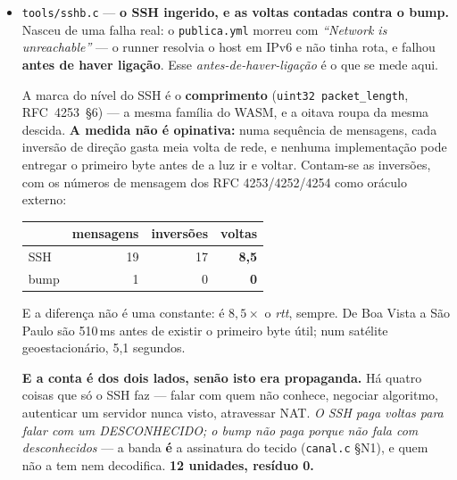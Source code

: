 \documentclass[11pt]{article}
\newcommand{\code}[1]{\texttt{\small #1}}
\theoremstyle{plain}
\theoremstyle{remark}
\begin{document}
\begin{itemize}
\textbf{E a ISA não precisou de crescer.} A do broca-so faz \code{LOAD} como
$B\leftarrow A;\ A\leftarrow \text{mem}[s]$ --- deslocar $A$ para $B$ e pôr o novo em $A$
\textbf{é literalmente um \emph{push} numa pilha de dois}. Simulando a pilha sobre os onze pares da
tradução, ela \textbf{nunca precisa de mais de dois}: os seis binários do wasm caem todos na ULA
sobre $(A,B)$, e o terceiro registador $R$ é onde o \code{STORE} grava. \emph{A nossa ISA já era de
pilha, com a pilha escrita por extenso.} \textbf{12 unidades, resíduo 0.}


\item \code{tools/sshb.c} --- \textbf{o SSH ingerido, e as voltas contadas contra o bump.} Nasceu
de uma falha real: o \code{publica.yml} morreu com \emph{``Network is unreachable''} --- o runner
resolvia o host em IPv6 e não tinha rota, e falhou \textbf{antes de haver ligação}. Esse
\emph{antes-de-haver-ligação} é o que se mede aqui.

A marca do nível do SSH é o \textbf{comprimento} (\code{uint32 packet\_length}, RFC~4253~§6) ---
a mesma família do WASM, e a oitava roupa da mesma descida. \textbf{A medida não é opinativa:} numa
sequência de mensagens, cada inversão de direção gasta meia volta de rede, e nenhuma implementação
pode entregar o primeiro byte antes de a luz ir e voltar. Contam-se as inversões, com os números de
mensagem dos RFC 4253/4252/4254 como oráculo externo:

\begin{center}
\begin{tabular}{lrrr}
\toprule
 & mensagens & inversões & \textbf{voltas} \\
\midrule
SSH & 19 & 17 & \textbf{8,5} \\
bump & 1 & 0 & \textbf{0} \\
\bottomrule
\end{tabular}
\end{center}

E a diferença não é uma constante: é $8{,}5\times$ o \emph{rtt}, sempre. De Boa Vista a São Paulo
são 510\,ms antes de existir o primeiro byte útil; num satélite geoestacionário, 5,1 segundos.

\textbf{E a conta é dos dois lados, senão isto era propaganda.} Há quatro coisas que só o SSH faz
--- falar com quem não conhece, negociar algoritmo, autenticar um servidor nunca visto, atravessar
NAT. \emph{O SSH paga voltas para falar com um DESCONHECIDO; o bump não paga porque não fala com
desconhecidos} --- a banda \textbf{é} a assinatura do tecido (\code{canal.c} §N1), e quem não a tem
nem decodifica. \textbf{12 unidades, resíduo 0.}



\end{itemize}
\end{document}
